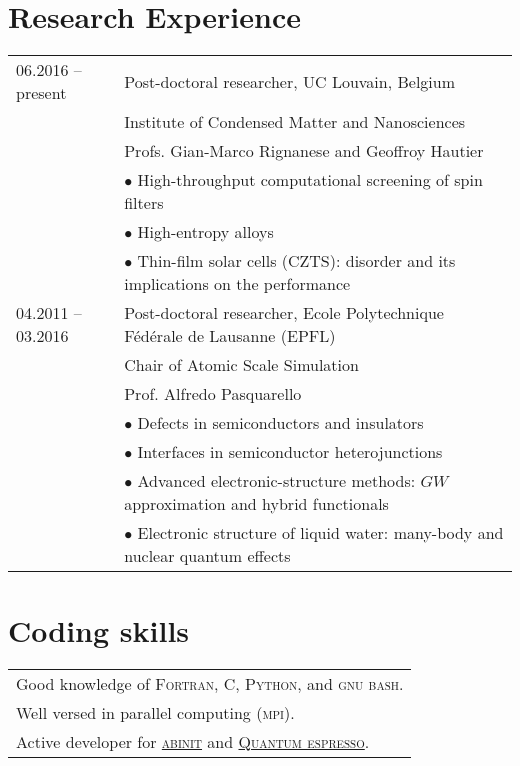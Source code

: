 \documentclass[a4paper, 11pt, DIV=15,headings=normal]{scrartcl}
\begin{document}
\section*{Research Experience}
\begin{tabular}{ll}
06.2016 -- present & Post-doctoral researcher, UC Louvain, Belgium \\
                   & Institute of Condensed Matter and Nanosciences\\ 
                   & Profs. Gian-Marco Rignanese and Geoffroy Hautier  \\
                   & $\bullet$ High-throughput computational screening of spin filters \\
                   & $\bullet$ High-entropy alloys \\
                   & $\bullet$ Thin-film solar cells (CZTS): disorder and its implications on the performance \\
                
04.2011 -- 03.2016 & Post-doctoral researcher, Ecole Polytechnique F\'{e}d\'{e}rale de Lausanne (EPFL) \\
                   & Chair of Atomic Scale Simulation  \\
                   & Prof. Alfredo Pasquarello \\
                   & $\bullet$ Defects in semiconductors and insulators \\
                   & $\bullet$ Interfaces in semiconductor heterojunctions  \\
                   & $\bullet$ Advanced electronic-structure methods: $GW$ approximation and hybrid functionals \\
                   & $\bullet$ Electronic structure of liquid water: many-body and nuclear quantum effects
\end{tabular}

\section*{Coding skills}
\begin{tabular}{l}
Good knowledge of \textsc{Fortran}, \textsc{C}, \textsc{Python}, and \textsc{gnu bash}.\\
Well versed in parallel computing (\textsc{mpi}). \\
Active developer for \href{http://www.abinit.org}{\textsc{abinit}} and 
\href{http://www.quantum-espresso.org}{\textsc{Quantum espresso}}. \\
\end{tabular}
\end{document}
